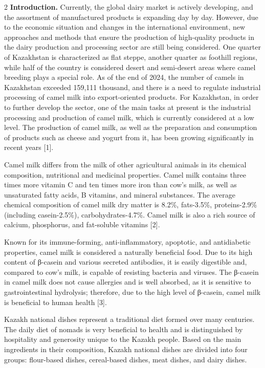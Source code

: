 \begin{multicols}{2}
{\bfseries Introduction.} Currently, the global dairy market is actively
developing, and the assortment of manufactured products is expanding day
by day. However, due to the economic situation and changes in the
international environment, new approaches and methods that ensure the
production of high-quality products in the dairy production and
processing sector are still being considered. One quarter of Kazakhstan
is characterized as flat steppe, another quarter as foothill regions,
while half of the country is considered desert and semi-desert areas
where camel breeding plays a special role. As of the end of 2024, the
number of camels in Kazakhstan exceeded 159,111 thousand, and there is a
need to regulate industrial processing of camel milk into
export-oriented products. For Kazakhstan, in order to further develop
the sector, one of the main tasks at present is the industrial
processing and production of camel milk, which is currently considered
at a low level. The production of camel milk, as well as the preparation
and consumption of products such as cheese and yogurt from it, has been
growing significantly in recent years {[}1{]}.

Camel milk differs from the milk of other agricultural animals in its
chemical composition, nutritional and medicinal properties. Camel milk
contains three times more vitamin C and ten times more iron than cow's
milk, as well as unsaturated fatty acids, B vitamins, and mineral
substances. The average chemical composition of camel milk dry matter is
8.2\%, fats-3.5\%, proteins-2.9\% (including casein-2.5\%),
carbohydrates-4.7\%. Camel milk is also a rich source of calcium,
phosphorus, and fat-soluble vitamins {[}2{]}.

Known for its immune-forming, anti-inflammatory, apoptotic, and
antidiabetic properties, camel milk is considered a naturally beneficial
food. Due to its high content of β-casein and various secreted
antibodies, it is easily digestible and, compared to cow's milk, is
capable of resisting bacteria and viruses. The β-casein in camel milk
does not cause allergies and is well absorbed, as it is sensitive to
gastrointestinal hydrolysis; therefore, due to the high level of
β-casein, camel milk is beneficial to human health {[}3{]}.

Kazakh national dishes represent a traditional diet formed over many
centuries. The daily diet of nomads is very beneficial to health and is
distinguished by hospitality and generosity unique to the Kazakh people.
Based on the main ingredients in their composition, Kazakh national
dishes are divided into four groups: flour-based dishes, cereal-based
dishes, meat dishes, and dairy dishes.


\end{multicols}
